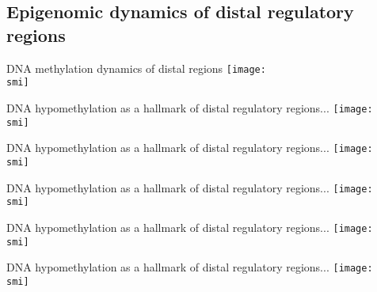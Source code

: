 \documentclass[10pt]{beamer}
\def\smi{out/ln/updir/mw-gcthesis-oral/library.bib}
\begin{document}
    \subsection{Epigenomic dynamics of distal regulatory regions}
    \begin{frame}{DNA methylation dynamics of distal regions}
      \def\smi{out/ln/updir/mw-gcthesis-oral/ink/hypometh-clusters/1.pdf}
      \texttt{[image: \\smi]}%
    \end{frame}
    \begin{frame}{DNA hypomethylation as a hallmark of distal regulatory regions...}
      \def\smi{out/ln/updir/mw-gcthesis-oral/ink/hypometh-clusters/2.pdf}
      \texttt{[image: \\smi]}%
    \end{frame}
    \begin{frame}{DNA hypomethylation as a hallmark of distal regulatory regions...}
      \def\smi{out/ln/updir/mw-gcthesis-oral/ink/hypometh-clusters/3.pdf}
      \texttt{[image: \\smi]}
    \end{frame}
    \begin{frame}{DNA hypomethylation as a hallmark of distal regulatory regions...}
      \def\smi{out/ln/updir/mw-gcthesis-oral/ink/hypometh-clusters/4.pdf}
      \texttt{[image: \\smi]}%
    \end{frame}
    \begin{frame}{DNA hypomethylation as a hallmark of distal regulatory regions...}
      \def\smi{out/ln/updir/mw-gcthesis-oral/ink/hypometh-clusters/5.pdf}
      \texttt{[image: \\smi]}
    \end{frame}
    \begin{frame}{DNA hypomethylation as a hallmark of distal regulatory regions...}
      \def\smi{out/ln/updir/mw-gcthesis-oral/ink/hypometh-clusters/6.pdf}
      \texttt{[image: \\smi]}
    \end{frame}
\end{document}
